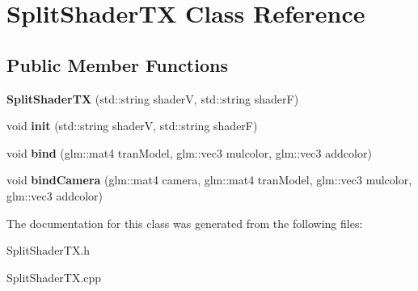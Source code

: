 \hypertarget{class_split_shader_t_x}{}\section{Split\+Shader\+TX Class Reference}
\label{class_split_shader_t_x}
\subsection*{Public Member Functions}
\begin{DoxyCompactItemize}
\item 
\hypertarget{class_split_shader_t_x_a6820393c3591a56cf057d73458fc9220}{}\label{class_split_shader_t_x_a6820393c3591a56cf057d73458fc9220} 
{\bfseries Split\+Shader\+TX} (std\+::string shaderV, std\+::string shaderF)
\item 
\hypertarget{class_split_shader_t_x_a89df0702804badd311eeb88fd6917dee}{}\label{class_split_shader_t_x_a89df0702804badd311eeb88fd6917dee} 
void {\bfseries init} (std\+::string shaderV, std\+::string shaderF)
\item 
\hypertarget{class_split_shader_t_x_a21c36c7e5a066da1b61b73ce7a6e9e07}{}\label{class_split_shader_t_x_a21c36c7e5a066da1b61b73ce7a6e9e07} 
void {\bfseries bind} (glm\+::mat4 tran\+Model, glm\+::vec3 mulcolor, glm\+::vec3 addcolor)
\item 
\hypertarget{class_split_shader_t_x_ad9f8e9b49e3534fe9ea0d383bf46c075}{}\label{class_split_shader_t_x_ad9f8e9b49e3534fe9ea0d383bf46c075} 
void {\bfseries bind\+Camera} (glm\+::mat4 camera, glm\+::mat4 tran\+Model, glm\+::vec3 mulcolor, glm\+::vec3 addcolor)
\end{DoxyCompactItemize}


The documentation for this class was generated from the following files\+:\begin{DoxyCompactItemize}
\item 
Split\+Shader\+T\+X.\+h\item 
Split\+Shader\+T\+X.\+cpp\end{DoxyCompactItemize}
